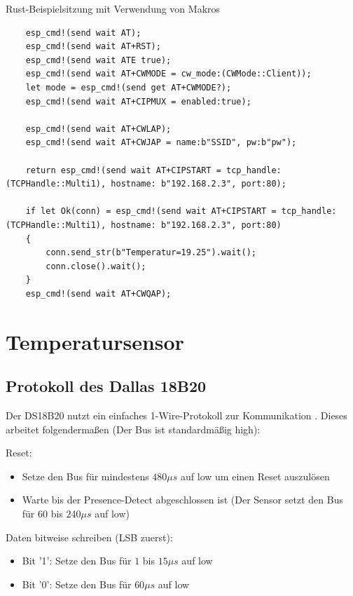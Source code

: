\documentclass
[ 12pt,
  parskip=half %
]{scrreprt}
\newenvironment{mylisting}[1][H]
{\captionsetup{aboveskip=-0.2\normalbaselineskip}\begin{listing}[#1]}
{\end{listing}}
\begin{document}
\begin{mylisting}
	\caption{Rust-Beispielsitzung mit Verwendung von Makros}
	\label{listing:at-example-rust-macros}
	\begin{verbatim}
	esp_cmd!(send wait AT);
	esp_cmd!(send wait AT+RST);	
	esp_cmd!(send wait ATE true);
	esp_cmd!(send wait AT+CWMODE = cw_mode:(CWMode::Client));
	let mode = esp_cmd!(send get AT+CWMODE?); 
	esp_cmd!(send wait AT+CIPMUX = enabled:true);
	
	esp_cmd!(send wait AT+CWLAP);	
	esp_cmd!(send wait AT+CWJAP = name:b"SSID", pw:b"pw");
	
	return esp_cmd!(send wait AT+CIPSTART = tcp_handle:(TCPHandle::Multi1), hostname: b"192.168.2.3", port:80);

	if let Ok(conn) = esp_cmd!(send wait AT+CIPSTART = tcp_handle:(TCPHandle::Multi1), hostname: b"192.168.2.3", port:80) 
	{
		conn.send_str(b"Temperatur=19.25").wait();
		conn.close().wait();
	}
	esp_cmd!(send wait AT+CWQAP);
	\end{verbatim}
\end{mylisting} 


\section{Temperatursensor}

\subsection{Protokoll des Dallas 18B20}

Der DS18B20 nutzt ein einfaches 1-Wire-Protokoll zur Kommunikation \cite{ds18b20-datasheet}. Dieses arbeitet folgendermaßen (Der Bus ist standardmäßig high):

Reset:
\begin{itemize}
	\item Setze den Bus für mindestens $480 \mu{s}$ auf low um einen Reset auszulösen
	\item Warte bis der Presence-Detect abgeschlossen ist (Der Sensor setzt den Bus für $60$ bis $240 \mu{s}$ auf low)
\end{itemize}

Daten bitweise schreiben (LSB zuerst):
\begin{itemize}
	\item Bit '1': Setze den Bus für $1$ bis $15 \mu{s}$ auf low
	\item Bit '0': Setze den Bus für $60 \mu{s}$ auf low
\end{itemize}
\end{document}
